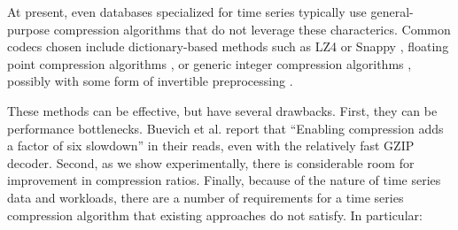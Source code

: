 
At present, even databases specialized for time series typically use general-purpose compression algorithms that do not leverage these characterics. Common codecs chosen include dictionary-based methods such as LZ4 \cite{lz4} or Snappy \cite{snappy}, floating point compression algorithms \cite{gorilla}, or generic integer compression algorithms \cite{influxDB, simple8b}, possibly with some form of invertible preprocessing \cite{influxDB, gorilla, berkeleyTreeDB}.


These methods can be effective, but have several drawbacks. First, they can be performance bottlenecks. Buevich et al. report that ``Enabling compression adds a factor of six slowdown'' \cite{respawnDB} in their reads, even with the relatively fast GZIP decoder. Second, as we show experimentally, there is considerable room for improvement in compression ratios. Finally, because of the nature of time series data and workloads, there are a number of requirements for a time series compression algorithm that existing approaches do not satisfy. In particular:






